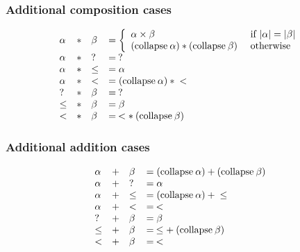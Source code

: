 \subsubsection{Additional composition cases}
\[
\begin{array}{llll}
\alpha  & * &\beta & = \left\{ \begin{array}{ll}
                          \alpha \times \beta & \mbox{ if } \vert \alpha \vert = \vert \beta \vert \\
                          (\mathrm{collapse}\: \alpha) * (\mathrm{collapse}\: \beta) & \mbox{ otherwise}  
                          \end{array}\right.\\ 
\alpha  & * & ?     & = \: ? \\
\alpha  & * & \leq  & = \alpha \\
\alpha  & * & <     & = (\mathrm{collapse}\: \alpha) \: * \: < \\
?       & * & \beta & = \: ? \\
\leq    & * & \beta & = \beta \\
<       & * & \beta & = \: < * \: (\mathrm{collapse}\: \beta)
\end{array}
\]
\subsubsection{Additional addition cases}

\[
\begin{array}{llll}
\alpha  & + &\beta & = (\mathrm{collapse}\: \alpha) + (\mathrm{collapse}\: \beta) \\ 
\alpha  & + & ?     & = \alpha \\
\alpha  & + & \leq  & = (\mathrm{collapse}\: \alpha) \: + \: \leq \\
\alpha  & + & <     & = \: < \\
?       & + & \beta & = \beta \\
\leq    & + & \beta & = \: \leq + \: (\mathrm{collapse}\: \beta)\\
<       & + & \beta & = \: < \\
\end{array}
\]

